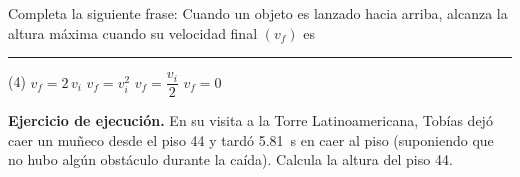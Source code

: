 \documentclass[12pt, letter]{exam}
\begin{document}
\begin{questions}
    \question Completa la siguiente frase: Cuando un objeto es lanzado hacia arriba, alcanza la altura máxima cuando su velocidad final $(v_{f})$ es \rule{2cm}{0.1mm}
    \begin{tasks}(4)
        \task $v_{f} = 2 \, v_{i}$
        \task $v_{f} = v_{i}^{2}$
        \task $v_{f} = \dfrac{v_{i}}{2}$
        \task $v_{f} = 0$
    \end{tasks}
    \question \label{Ejercicio_05} \textbf{Ejercicio de ejecución. } En su visita a la Torre Latinoamericana, Tobías dejó caer un muñeco desde el piso \num{44} y tardó \SI{5.81}{\second} en caer al piso (suponiendo que no hubo algún obstáculo durante la caída). Calcula la altura del piso \num{44}.

\end{questions}
\end{document}
